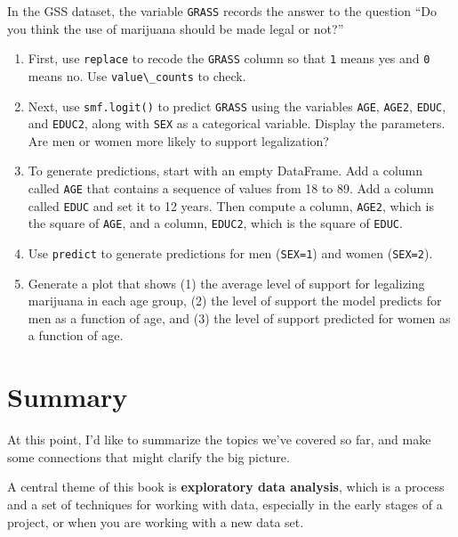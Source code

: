 In the GSS dataset, the variable \passthrough{\lstinline!GRASS!} records
the answer to the question ``Do you think the use of marijuana should be
made legal or not?''

\begin{enumerate}
\def\labelenumi{\arabic{enumi}.}
\item
  First, use \passthrough{\lstinline!replace!} to recode the
  \passthrough{\lstinline!GRASS!} column so that
  \passthrough{\lstinline!1!} means yes and \passthrough{\lstinline!0!}
  means no. Use \passthrough{\lstinline!value\_counts!} to check.
\item
  Next, use \passthrough{\lstinline!smf.logit()!} to predict
  \passthrough{\lstinline!GRASS!} using the variables
  \passthrough{\lstinline!AGE!}, \passthrough{\lstinline!AGE2!},
  \passthrough{\lstinline!EDUC!}, and \passthrough{\lstinline!EDUC2!},
  along with \passthrough{\lstinline!SEX!} as a categorical variable.
  Display the parameters. Are men or women more likely to support
  legalization?
\item
  To generate predictions, start with an empty DataFrame. Add a column
  called \passthrough{\lstinline!AGE!} that contains a sequence of
  values from 18 to 89. Add a column called
  \passthrough{\lstinline!EDUC!} and set it to 12 years. Then compute a
  column, \passthrough{\lstinline!AGE2!}, which is the square of
  \passthrough{\lstinline!AGE!}, and a column,
  \passthrough{\lstinline!EDUC2!}, which is the square of
  \passthrough{\lstinline!EDUC!}.
\item
  Use \passthrough{\lstinline!predict!} to generate predictions for men
  (\passthrough{\lstinline!SEX=1!}) and women
  (\passthrough{\lstinline!SEX=2!}).
\item
  Generate a plot that shows (1) the average level of support for
  legalizing marijuana in each age group, (2) the level of support the
  model predicts for men as a function of age, and (3) the level of
  support predicted for women as a function of age.
\end{enumerate}

\hypertarget{summary}{%
\section{Summary}\label{summary}}

At this point, I'd like to summarize the topics we've covered so far,
and make some connections that might clarify the big picture.

A central theme of this book is \textbf{exploratory data analysis},
which is a process and a set of techniques for working with data,
especially in the early stages of a project, or when you are working
with a new data set.

